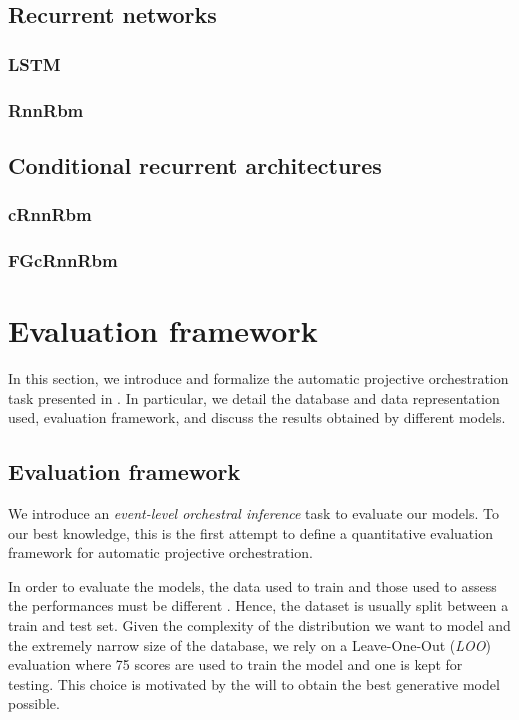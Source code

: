 \documentclass{article}
\begin{document}
\subsection{Recurrent networks}
\subsubsection{LSTM}
\subsubsection{RnnRbm}

\subsection{Conditional recurrent architectures}
\subsubsection{cRnnRbm}
\subsubsection{FGcRnnRbm}

\section{Evaluation framework}
In this section, we introduce and formalize the automatic projective orchestration task presented in . In particular, we detail the database and data representation used, evaluation framework, and discuss the results obtained by different models.

\subsection{Evaluation framework}
We introduce an \textit{event-level orchestral inference} task to evaluate our models. To our best knowledge, this is the first attempt to define a quantitative evaluation framework for automatic projective orchestration.

In order to evaluate the models, the data used to train and those used to assess the performances must be different \cite{bishop2006pattern}. Hence, the dataset is usually split between a train and test set.
Given the complexity of the distribution we want to model and the extremely narrow size of the database, we rely on a Leave-One-Out (\textit{LOO}) evaluation where 75 scores are used to train the model and one is kept for testing. This choice is motivated by the will to obtain the best generative model possible.
\end{document}
